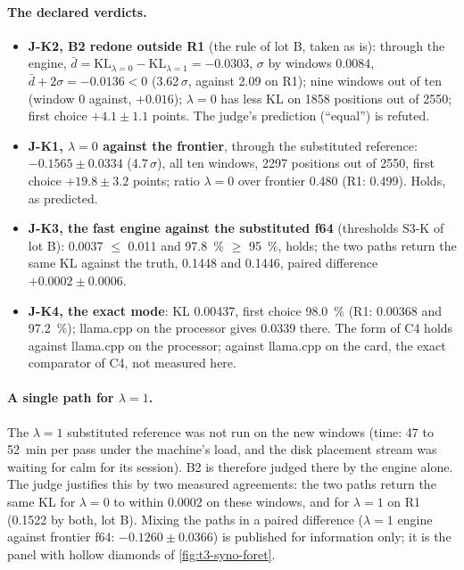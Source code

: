 \paragraph{The declared verdicts.}
\begin{itemize}
\item \textbf{J-K2, B2 redone outside R1} (the rule of lot B, taken as is): through the engine, $\bar d = \mathrm{KL}_{\lambda=0} - \mathrm{KL}_{\lambda=1} = -\num{0.0303}$, $\sigma$ by windows \num{0.0084}, $\bar d + 2\sigma = -\num{0.0136} < 0$ (\num{3.62}\,$\sigma$, against \num{2.09} on R1); nine windows out of ten (window 0 against, $+\num{0.016}$); $\lambda = 0$ has less KL on \num{1858} positions out of \num{2550}; first choice $+\num{4.1} \pm \num{1.1}$ points. The judge's prediction (``equal'') is refuted.
\item \textbf{J-K1, $\lambda = 0$ against the frontier}, through the substituted reference: $-\num{0.1565} \pm \num{0.0334}$ (\num{4.7}\,$\sigma$), all ten windows, \num{2297} positions out of \num{2550}, first choice $+\num{19.8} \pm \num{3.2}$ points; ratio $\lambda = 0$ over frontier \num{0.480} (R1: \num{0.499}). Holds, as predicted.
\item \textbf{J-K3, the fast engine against the substituted f64} (thresholds S3-K of lot B): \num{0.0037} $\le$ \num{0.011} and \SI{97.8}{\percent} $\ge$ \SI{95}{\percent}, holds; the two paths return the same KL against the truth, \num{0.1448} and \num{0.1446}, paired difference $+\num{0.0002} \pm \num{0.0006}$.
\item \textbf{J-K4, the exact mode}: KL \num{0.00437}, first choice \SI{98.0}{\percent} (R1: \num{0.00368} and \SI{97.2}{\percent}); llama.cpp on the processor gives \num{0.0339} there. The form of C4 holds against llama.cpp on the processor; against llama.cpp on the card, the exact comparator of C4, not measured here.
\end{itemize}

\paragraph{A single path for $\lambda = 1$.} The $\lambda = 1$ substituted reference was not run on the new windows (time: 47 to \SI{52}{\minute} per pass under the machine's load, and the disk placement stream was waiting for calm for its session). B2 is therefore judged there by the engine alone. The judge justifies this by two measured agreements: the two paths return the same KL for $\lambda = 0$ to within \num{0.0002} on these windows, and for $\lambda = 1$ on R1 (\num{0.1522} by both, lot B). Mixing the paths in a paired difference ($\lambda = 1$ engine against frontier f64: $-\num{0.1260} \pm \num{0.0366}$) is published for information only; it is the panel with hollow diamonds of \cref{fig:t3-syno-foret}.

